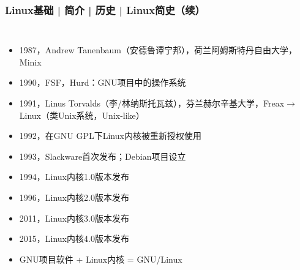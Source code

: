 \begin{frame}
  \frametitle{Linux基础 | 简介 | 历史 | Linux简史（续）}
  \begin{columns}
  \begin{itemize}[<+->]
    \item 1987，Andrew Tanenbaum（安德鲁\textbullet 谭宁邦），荷兰阿姆斯特丹自由大学，Minix
    \item 1990，FSF，Hurd：GNU项目中的操作系统
    \item 1991，\alert{Linus Torvalds}（李/林纳斯\textbullet 托瓦兹），芬兰赫尔辛基大学，Freax$\rightarrow$ \alert{Linux}（类Unix系统，Unix-like）
    \item 1992，在GNU GPL下Linux内核被重新授权使用
    \item 1993，Slackware首次发布；Debian项目设立
    \item 1994，Linux内核1.0版本发布
    \item 1996，Linux内核2.0版本发布
    \item 2011，Linux内核3.0版本发布
    \item 2015，Linux内核4.0版本发布
    \item GNU项目软件 + Linux内核 = \alert{GNU/Linux}
  \end{itemize}
  \end{columns}
\end{frame}

